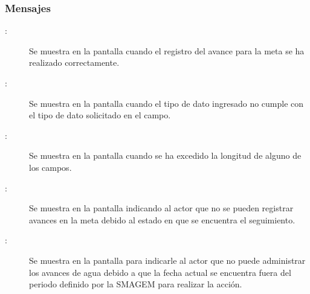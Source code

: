 \subsubsection{Mensajes}

    \begin{description}
    
        \item [:] Se muestra en la pantalla  cuando el registro del avance para la meta se ha realizado correctamente.
        
        \item [:] Se muestra en la pantalla  cuando el tipo de dato ingresado no cumple con el tipo de dato solicitado en el campo.
        
        \item [:] Se muestra en la pantalla  cuando se ha excedido la longitud de alguno de los campos.  
        
        \item [:] Se muestra en la pantalla  indicando al actor que no se pueden registrar avances en la meta debido al estado en que se encuentra el seguimiento.

        \item [:] Se muestra en la pantalla  para indicarle al actor que no puede administrar los avances de agua debido a que la fecha actual se encuentra fuera del periodo definido por la SMAGEM para realizar la acción.

    \end{description}
